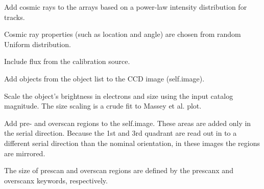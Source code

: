 \documentclass[a4paper,12pt,english]{sphinxmanual}
\begin{document}
\begin{fulllineitems}
\begin{fulllineitems}
\end{fulllineitems}


\begin{fulllineitems}
\label{simulator:simulator.simulator.VISsimulator.addCosmicRays}
Add cosmic rays to the arrays based on a power-law intensity distribution for tracks.

Cosmic ray properties (such as location and angle) are chosen from random Uniform distribution.

\end{fulllineitems}


\begin{fulllineitems}
\label{simulator:simulator.simulator.VISsimulator.addLampFlux}
Include flux from the calibration source.

\end{fulllineitems}


\begin{fulllineitems}
\label{simulator:simulator.simulator.VISsimulator.addObjects}
Add objects from the object list to the CCD image (self.image).

Scale the object's brightness in electrons and size using the input catalog magnitude.
The size scaling is a crude fit to Massey et al. plot.

\end{fulllineitems}


\begin{fulllineitems}
\label{simulator:simulator.simulator.VISsimulator.addPreOverScans}
Add pre- and overscan regions to the self.image. These areas are added only in the serial direction.
Because the 1st and 3rd quadrant are read out in to a different serial direction than the nominal
orientation, in these images the regions are mirrored.

The size of prescan and overscan regions are defined by the prescanx and overscanx keywords, respectively.


\end{fulllineitems}
\end{fulllineitems}
\end{document}
